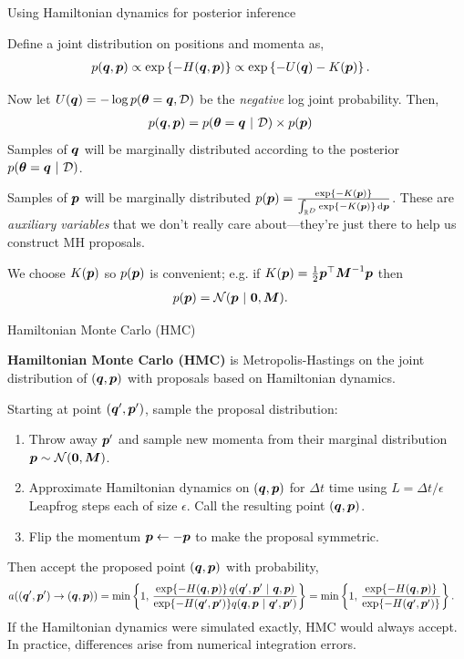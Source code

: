 \documentclass[aspectratio=169]{beamer}
\begin{document}
\begin{frame}{Using Hamiltonian dynamics for posterior inference}

Define a joint distribution on positions and momenta as,
\begin{align}
    p(\boldsymbol{q}, \boldsymbol{p}) &\propto \exp \left \{-H(\boldsymbol{q}, \boldsymbol{p}) \right \} \propto 
    \exp \left \{-U(\boldsymbol{q}) - K(\boldsymbol{p})\right \}.
\end{align}

Now let $U(\boldsymbol{q}) = -\log p(\boldsymbol{\theta} = \boldsymbol{q}, \mathcal{D})$ be the \textit{negative} log joint probability. Then,
\begin{align}
    p(\boldsymbol{q}, \boldsymbol{p}) &= p(\boldsymbol{\theta} = \boldsymbol{q} ~\vert~ \mathcal{D}) \times p(\boldsymbol{p})
\end{align}
Samples of $\boldsymbol{q}$ will be marginally distributed according to the posterior $p(\boldsymbol{\theta} = \boldsymbol{q} ~\vert~ \mathcal{D})$.

Samples of $\boldsymbol{p}$ will be marginally distributed $p(\boldsymbol{p}) = \frac{\exp \{ -K(\boldsymbol{p})\}}{\int_{\mathbb{R}^D} \exp \{-K(\boldsymbol{p})\} \mathop{}\!\mathrm{d} \boldsymbol{p}}$. These are \textit{auxiliary variables} that we don't really care about---they're just there to help us construct MH proposals. 

We choose $K(\boldsymbol{p})$ so $p(\boldsymbol{p})$ is convenient; e.g. if $K(\boldsymbol{p}) = \frac{1}{2} \boldsymbol{p}^\top \boldsymbol{M}^{-1} \boldsymbol{p}$ then
\begin{align}
    p(\boldsymbol{p}) &= \mathcal{N}(\boldsymbol{p} ~\vert~ \boldsymbol{0}, \boldsymbol{M}).
\end{align}

\end{frame}

\begin{frame}{Hamiltonian Monte Carlo (HMC)}

\textbf{Hamiltonian Monte Carlo (HMC)} is Metropolis-Hastings on the joint distribution of $(\boldsymbol{q}, \boldsymbol{p})$ with proposals based on Hamiltonian dynamics.

Starting at point $(\boldsymbol{q}', \boldsymbol{p}')$, sample the proposal distribution:
\begin{enumerate}
    \item Throw away $\boldsymbol{p}'$ and sample new momenta from their marginal distribution $\boldsymbol{p} \sim \mathcal{N}(\boldsymbol{0}, \boldsymbol{M})$.
    \item Approximate Hamiltonian dynamics on $(\boldsymbol{q}, \boldsymbol{p})$ for $\Delta t$ time using $L = \Delta t/\epsilon$ Leapfrog steps each of size $\epsilon$. Call the resulting point $(\boldsymbol{q}, \boldsymbol{p})$.
    \item Flip the momentum $\boldsymbol{p} \leftarrow -\boldsymbol{p}$ to make the proposal symmetric.
\end{enumerate}

Then accept the proposed point $(\boldsymbol{q}, \boldsymbol{p})$ with probability,
\begin{align}
    a((\boldsymbol{q}', \boldsymbol{p}') \to (\boldsymbol{q}, \boldsymbol{p})) &= 
    \min \left\{1, \, \frac{\exp\{-H(\boldsymbol{q}, \boldsymbol{p})\} \, q(\boldsymbol{q}', \boldsymbol{p}' ~\vert~ \boldsymbol{q}, \boldsymbol{p})}{\exp\{-H(\boldsymbol{q}', \boldsymbol{p}')\} q(\boldsymbol{q}, \boldsymbol{p} ~\vert~ \boldsymbol{q}', \boldsymbol{p}')} \right \}
    =
    \min \left\{1, \, \frac{\exp\{-H(\boldsymbol{q}, \boldsymbol{p})\}}{\exp \{-H(\boldsymbol{q}', \boldsymbol{p}')\}} \right \}.
\end{align}
If the Hamiltonian dynamics were simulated exactly, HMC would always accept. In practice, differences arise from numerical integration errors.

\end{frame}
\end{document}
